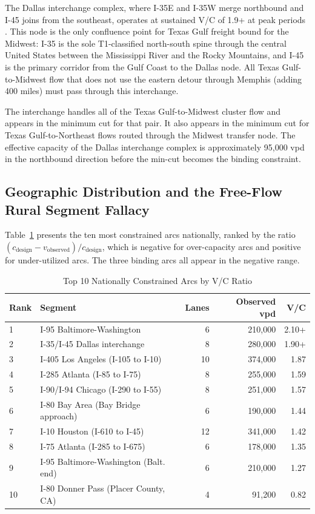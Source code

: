 The Dallas interchange complex, where I-35E and I-35W merge northbound and I-45 joins from the southeast, operates at sustained V/C of 1.9+ at peak periods \citep{HPMS2018,ATRI_costs2024}. This node is the only confluence point for Texas Gulf freight bound for the Midwest: I-35 is the sole T1-classified north-south spine through the central United States between the Mississippi River and the Rocky Mountains, and I-45 is the primary corridor from the Gulf Coast to the Dallas node. All Texas Gulf-to-Midwest flow that does not use the eastern detour through Memphis (adding 400 miles) must pass through this interchange.

The interchange handles all of the Texas Gulf-to-Midwest cluster flow and appears in the minimum cut for that pair. It also appears in the minimum cut for Texas Gulf-to-Northeast flows routed through the Midwest transfer node. The effective capacity of the Dallas interchange complex is approximately 95,000 vpd in the northbound direction before the min-cut becomes the binding constraint.

\subsection{Geographic Distribution and the Free-Flow Rural Segment Fallacy}

Table~\ref{tab:top10arcs} presents the ten most constrained arcs nationally, ranked by the ratio $(c_\text{design} - v_\text{observed}) / c_\text{design}$, which is negative for over-capacity arcs and positive for under-utilized arcs. The three binding arcs all appear in the negative range.

\begin{table}[ht]
\centering
\caption{Top 10 Nationally Constrained Arcs by V/C Ratio}
\label{tab:top10arcs}
\begin{tabular}{llrrr}
\toprule
Rank & Segment & Lanes & Observed vpd & V/C \\
\midrule
1 & I-95 Baltimore-Washington & 6 & 210,000 & 2.10+ \\
2 & I-35/I-45 Dallas interchange & 8 & 280,000 & 1.90+ \\
3 & I-405 Los Angeles (I-105 to I-10) & 10 & 374,000 & 1.87 \\
4 & I-285 Atlanta (I-85 to I-75) & 8 & 255,000 & 1.59 \\
5 & I-90/I-94 Chicago (I-290 to I-55) & 8 & 251,000 & 1.57 \\
6 & I-80 Bay Area (Bay Bridge approach) & 6 & 190,000 & 1.44 \\
7 & I-10 Houston (I-610 to I-45) & 12 & 341,000 & 1.42 \\
8 & I-75 Atlanta (I-285 to I-675) & 6 & 178,000 & 1.35 \\
9 & I-95 Baltimore-Washington (Balt. end) & 6 & 210,000 & 1.27 \\
10 & I-80 Donner Pass (Placer County, CA) & 4 & 91,200 & 0.82 \\
\bottomrule
\end{tabular}
\end{table}

